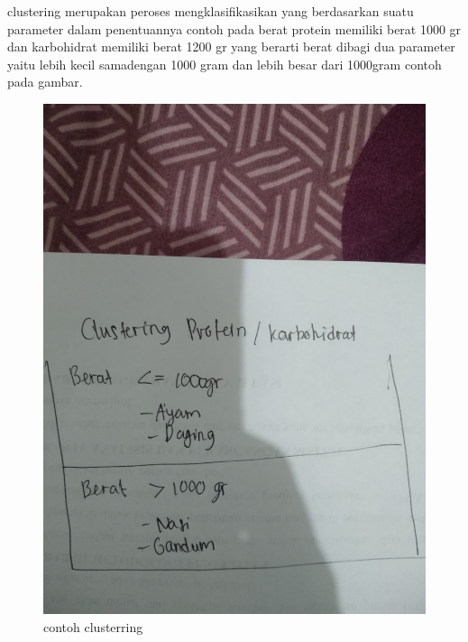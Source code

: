 \begin{enumerate}
clustering merupakan peroses mengklasifikasikan yang berdasarkan suatu parameter dalam penentuannya contoh pada berat protein memiliki berat 1000 gr dan karbohidrat memiliki berat 1200 gr yang berarti berat dibagi dua parameter yaitu lebih kecil samadengan 1000 gram dan lebih besar dari 1000gram contoh pada gambar.\par
\begin{figure}[ht]
\centering
\includegraphics[scale=0.01]{figures/1174050/chapter2/4.jpg}
\caption{contoh clusterring}
\label{contoh}
\end{figure}



\end{enumerate}
